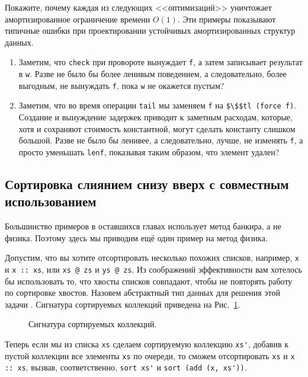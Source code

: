 \begin{exercise}\label{ex:6.6}
  Покажите, почему каждая из следующих <<оптимизаций>> уничтожает
  амортизированное ограничение времени $O(1)$. Эти примеры показывают
  типичные ошибки при проектировании устойчивых амортизированных
  структур данных.
  \begin{enumerate}
  \item Заметим, что \lstinline!check! при провороте вынуждает
    \lstinline!f!, а затем записывает результат в \lstinline!w!. Разве не
    было бы более ленивым поведением, а следовательно, более выгодным,
    не вынуждать \lstinline!f!, пока \lstinline!w! не окажется пустым?
  \item Заметим, что во время операции \lstinline!tail! мы заменяем
    \lstinline!f! на \lstinline!$\$$tl (force f)!. Создание и
    вынуждение задержек приводит к заметным расходам, которые, хотя и
    сохраняют стоимость константной, могут сделать константу слишком
    большой. Разве не было бы ленивее, а следовательно, лучше, не изменять
    \lstinline!f!, а просто уменьшать \lstinline!lenf!, показывая
    таким образом, что элемент удален?
  \end{enumerate}
\end{exercise}

\subsection{Сортировка слиянием снизу вверх с совместным
  использованием}
\label{sc:6.4.3}

Большинство примеров в оставшихся главах использует метод банкира, а
не физика. Поэтому здесь мы приводим ещё один пример на метод физика.

Допустим, что вы хотите отсортировать несколько похожих списков,
например, \lstinline!x! и \lstinline!x :: xs!, или \lstinline!xs @ zs! и
\lstinline!ys @ zs!. Из соображений эффективности вам хотелось бы
использовать то, что хвосты списков совпадают, чтобы не повторять
работу по сортировке хвостов.  Назовем абстрактный тип данных для
решения этой задачи . Сигнатура сортируемых коллекций приведена на
Рис.~\ref{fig:6.4}.

\begin{figure}
  \centering

  \caption{Сигнатура сортируемых коллекций.}
  \label{fig:6.4}
\end{figure}

Теперь если мы из списка \lstinline!xs! сделаем сортируемую коллекцию
\lstinline!xs'!, добавив к пустой коллекции все элементы
\lstinline!xs! по очереди, то сможем отсортировать \lstinline!xs! и
\lstinline!x :: xs!, вызвав, соответственно, \lstinline!sort xs'! и
\lstinline!sort (add (x, xs'))!.

